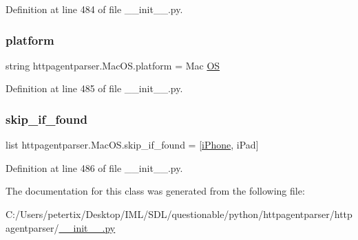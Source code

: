 Definition at line 484 of file \+\_\+\+\_\+init\+\_\+\+\_\+.\+py.

\hypertarget{classhttpagentparser_1_1_mac_o_s_a5b78e3283f6dfdb66c9abed2959934a9}{}\label{classhttpagentparser_1_1_mac_o_s_a5b78e3283f6dfdb66c9abed2959934a9} 
\subsubsection{\texorpdfstring{platform}{platform}}
{\footnotesize\ttfamily string httpagentparser.\+Mac\+O\+S.\+platform = \textquotesingle{}Mac \hyperlink{classhttpagentparser_1_1_o_s}{OS}\textquotesingle{}\hspace{0.3cm}{\ttfamily [static]}}



Definition at line 485 of file \+\_\+\+\_\+init\+\_\+\+\_\+.\+py.

\hypertarget{classhttpagentparser_1_1_mac_o_s_a87a33dff069765b738ccff6126268123}{}\label{classhttpagentparser_1_1_mac_o_s_a87a33dff069765b738ccff6126268123} 
\subsubsection{\texorpdfstring{skip\+\_\+if\+\_\+found}{skip\_if\_found}}
{\footnotesize\ttfamily list httpagentparser.\+Mac\+O\+S.\+skip\+\_\+if\+\_\+found = \mbox{[}\textquotesingle{}\hyperlink{classhttpagentparser_1_1i_phone}{i\+Phone}\textquotesingle{}, \textquotesingle{}i\+Pad\textquotesingle{}\mbox{]}\hspace{0.3cm}{\ttfamily [static]}}



Definition at line 486 of file \+\_\+\+\_\+init\+\_\+\+\_\+.\+py.



The documentation for this class was generated from the following file\+:\begin{DoxyCompactItemize}
\item 
C\+:/\+Users/petertix/\+Desktop/\+I\+M\+L/\+S\+D\+L/questionable/python/httpagentparser/httpagentparser/\hyperlink{____init_____8py}{\+\_\+\+\_\+init\+\_\+\+\_\+.\+py}\end{DoxyCompactItemize}
